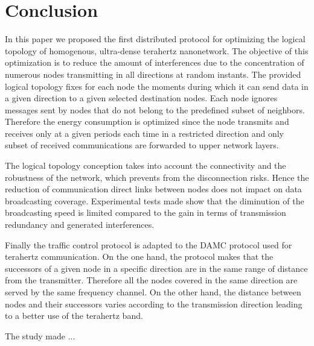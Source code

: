 \documentclass[letterpaper, 10 pt, conference]{ieeeconf}
\begin{document}
\section{Conclusion}
In this paper we proposed the first distributed protocol for optimizing the logical topology of homogenous, ultra-dense terahertz nanonetwork. The objective of this optimization is to reduce the amount of interferences due to the concentration of numerous nodes transmitting in all directions at random instants. The provided logical topology fixes for each node the moments during which it can send data in a given direction to a given selected destination nodes. Each node ignores messages sent by nodes that do not belong to the predefined subset of neighbors. Therefore the energy consumption is optimized since the node transmits and receives only at a given periods each time in a restricted direction and only subset of received communications are forwarded to upper network layers. 
  
The logical topology conception takes into account the connectivity and the robustness of the network, which prevents from the disconnection risks. Hence the reduction of communication direct links between nodes does not impact on data broadcasting coverage. Experimental tests made show that the diminution of the broadcasting speed is limited compared to the gain in terms of transmission redundancy and generated interferences.

Finally the traffic control protocol is adapted to the DAMC protocol used for terahertz communication. On the one hand, the protocol makes that the successors of a given node in a specific direction are in the same range of distance from the transmitter. Therefore all the nodes covered in the same direction are served by the same frequency channel. On the other hand, the distance between nodes and their successors varies according to the transmission direction leading to a better use of the terahertz band.

The study made ...
 
\end{document}
